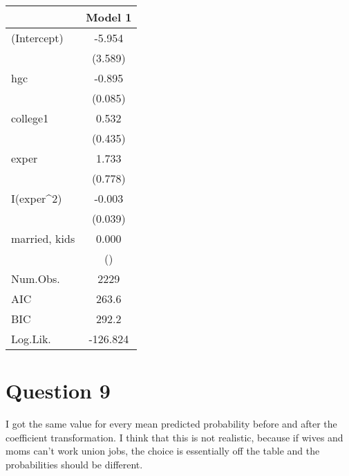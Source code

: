 \documentclass{homework}
\begin{document}
\begin{table}[h]
\centering
\begin{tabular}[t]{lc}
\toprule
  & Model 1\\
\midrule
(Intercept) & -5.954\\
 & (3.589)\\
hgc & -0.895\\
 & (0.085)\\
college1 & 0.532\\
 & (0.435)\\
exper & 1.733\\
 & (0.778)\\
I(exper\textasciicircum{}2) & -0.003\\
 & (0.039)\\
married, kids & 0.000\\
 & ()\\
\midrule
Num.Obs. & 2229\\
AIC & 263.6\\
BIC & 292.2\\
Log.Lik. & -126.824\\
\bottomrule
\end{tabular}
\end{table}


\section{Question 9}
I got the same value for every mean predicted probability before and after the coefficient transformation. I think that this is not realistic, because if wives and moms can't work union jobs, the choice is essentially off the table and the probabilities should be different.
\end{document}
